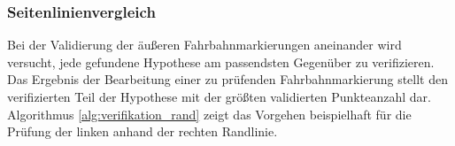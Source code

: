 \subsubsection{Seitenlinienvergleich} 
\label{sssec:fahrspurerkennung:riverflow:verifikation:seitenlinienvergleich}

Bei der Validierung der äußeren Fahrbahnmarkierungen aneinander wird versucht, jede gefundene Hypothese am passendsten Gegenüber zu verifizieren. 
Das Ergebnis der Bearbeitung einer zu prüfenden Fahrbahnmarkierung stellt den verifizierten Teil der Hypothese mit der größten validierten Punkteanzahl dar.
Algorithmus \ref{alg:verifikation_rand} zeigt das Vorgehen beispielhaft für die Prüfung der linken anhand der rechten Randlinie. 


